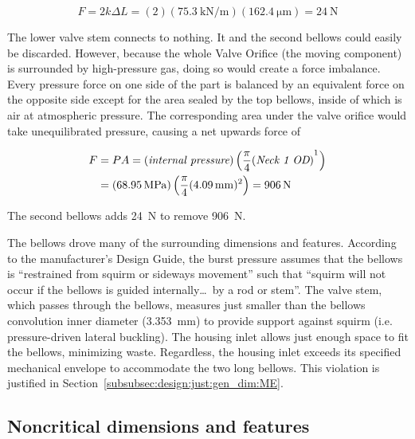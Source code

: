 \documentclass[12pt, letterpaper]{report}%
\newcounter{mycounter}           %
\newcounter{sub}[mycounter]      %
\newcommand{\specBellowsK}{\SI{75.3}{\kilo \newton \per \meter}} %
\newcommand{\specBellowsID}{\SI{3.353}{\milli \meter}} %
\newcommand{\specPressure}{\SI{68.95}{\mega \pascal}}%
\newcommand{\specActDefHot}{\SI{162.4}{\micro \meter}}
\begin{document}
		\begin{equation}
			F = 2 k \Delta L = (2) \left(\specBellowsK \right) \left(\specActDefHot \right) = \SI{24}{\newton}
			\label{eq:bellow_F}
		\end{equation}

		The lower valve stem connects to nothing. It and the second bellows could easily be discarded.
		However, because the whole Valve Orifice (the moving component) is surrounded by high-pressure gas, doing so would create a force imbalance.
		Every pressure force on one side of the part is balanced by an equivalent force on the opposite side except for the area sealed by the top bellows,
		inside of which is air at atmospheric pressure.
		The corresponding area under the valve orifice would take unequilibrated pressure, causing a net upwards force of

		\begin{equation}
			\begin{aligned}
				F &= P A = (\textit{internal pressure}) \left( \frac{\pi}{4} (\textit{Neck 1 OD})^{\footnotemark} \right) \\
				& = (\specPressure) \left( \frac{\pi}{4} (\SI{4.09}{\milli\meter})^2 \right) = \SI{906}{\newton}
			\end{aligned}
		\end{equation}

		The second bellows adds \SI{24}{\newton} to remove \SI{906}{\newton}.

		The bellows drove many of the surrounding dimensions and features.
		According to the manufacturer's Design Guide, the burst pressure assumes that the bellows is ``restrained from squirm or sideways movement'' such that ``squirm will not occur if the bellows is guided internally\ldots\ by a rod or stem''\cite{ref_miniflex_design}.
		The valve stem, which passes through the bellows, measures just smaller than the bellows convolution inner diameter (\specBellowsID) to provide support against squirm (i.e. pressure-driven lateral buckling).
		The housing inlet allows just enough space to fit the bellows, minimizing waste. Regardless, the housing inlet exceeds its specified mechanical envelope to accommodate the two long bellows.
		This violation is justified in Section~\ref{subsubsec:design:just:gen_dim:ME}.

		\subsection{Noncritical dimensions and features}
		\label{subsec:design:just:gen_dim}
\end{document}
